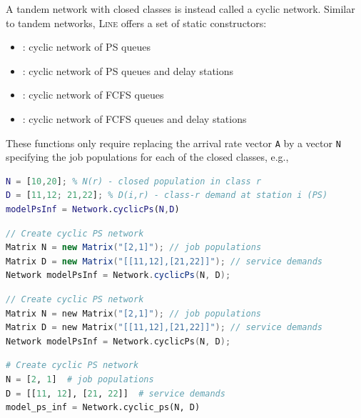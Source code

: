 A tandem network with closed classes is instead called a cyclic network. Similar to tandem networks, \textsc{Line} offers a set of static constructors:
\begin{itemize}
\item {}: cyclic network of PS queues
\item {}: cyclic network of PS queues and delay stations
\item {}: cyclic network of FCFS queues
\item {}: cyclic network of FCFS queues and delay stations
\end{itemize}
These functions only require replacing the arrival rate vector \texttt{A} by a vector \texttt{N} specifying the job populations for each of the closed classes, e.g.,
\begin{MATLAB}
\begin{lstlisting}[language = matlab]
N = [10,20]; % N(r) - closed population in class r
D = [11,12; 21,22]; % D(i,r) - class-r demand at station i (PS)
modelPsInf = Network.cyclicPs(N,D)
\end{lstlisting}
\end{MATLAB}
\begin{JAVA}
\begin{lstlisting}[language=java, basicstyle=\ttfamily\scriptsize]
// Create cyclic PS network
Matrix N = new Matrix("[2,1]"); // job populations
Matrix D = new Matrix("[[11,12],[21,22]]"); // service demands
Network modelPsInf = Network.cyclicPs(N, D);
\end{lstlisting}
\end{JAVA}
\begin{KOTLIN}
\begin{lstlisting}[language=kotlin, basicstyle=\ttfamily\scriptsize]
// Create cyclic PS network
Matrix N = new Matrix("[2,1]"); // job populations
Matrix D = new Matrix("[[11,12],[21,22]]"); // service demands
Network modelPsInf = Network.cyclicPs(N, D);
\end{lstlisting}
\end{KOTLIN}
\begin{PYTHON}
\begin{lstlisting}[language = python]
# Create cyclic PS network
N = [2, 1]  # job populations
D = [[11, 12], [21, 22]]  # service demands
model_ps_inf = Network.cyclic_ps(N, D)
\end{lstlisting}
\end{PYTHON}


